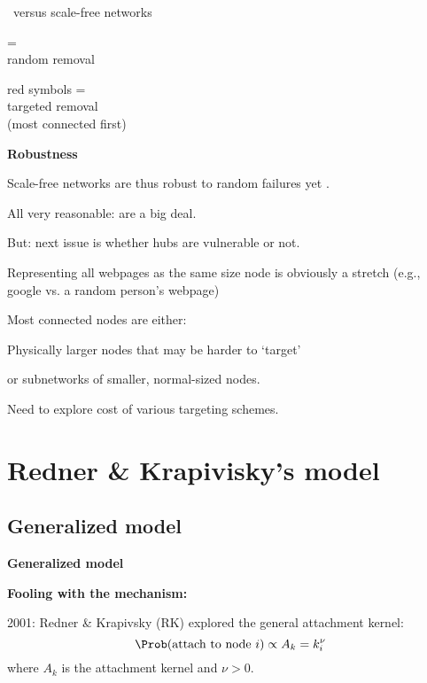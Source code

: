 \begin{frame}[label=]
\begin{frame}[label=]
\begin{frame}[label=]
\begin{frame}[label=]
\begin{frame}[label=]
\begin{frame}[label=]
\begin{frame}[label=]
\begin{frame}[label=]
\begin{frame}[label=]
\begin{frame}[label=]
\begin{frame}[label=]
\begin{frame}[label=]
\begin{frame}[label=]
\begin{frame}[label=]
\begin{frame}[label=]
\begin{frame}[label=]
\begin{frame}[label=]
\begin{frame}[label=]
\begin{frame}[label=]
\begin{frame}[label=]
     \erdosrenyi\ versus scale-free networks
   
    = \\
   {random} removal
   
   \alert{red symbols} = \\
   {targeted} removal \\
   (most connected first)
   

 


\begin{frame}[label=]
  \textbf{Robustness}  
  
  
  
    Scale-free networks are thus \alert{robust to random failures}
    yet .
   
    All very reasonable:  are a big deal.
   
    \alert{But}: next issue is whether hubs are vulnerable or not.
   
    Representing all webpages as the same size node is obviously
    a stretch (e.g., google vs. a random person's webpage)
   
    Most connected nodes are either:
    
    
      Physically larger nodes that may be harder to `target'
    
      or subnetworks of smaller, normal-sized nodes.
    
   
    Need to explore cost of various targeting schemes.
  
  


\section{Redner \& Krapivisky's model}

\subsection{Generalized model}


\begin{frame}[label=]
  \textbf{Generalized model}  

  \textbf{Fooling with the mechanism:}
    
    
      2001: Redner \& Krapivsky (RK)\cite{krapivsky2001a}
      explored the \alert{general attachment kernel}:
      {
      $$
      \Prob(\mbox{attach to node $i$}) \propto A_k  = k_{i}^\nu
      $$
      where $A_k$ is the attachment kernel and $\nu>0$.
      }
    

\end{frame}
\end{frame}
\end{frame}
\end{frame}
\end{frame}
\end{frame}
\end{frame}
\end{frame}
\end{frame}
\end{frame}
\end{frame}
\end{frame}
\end{frame}
\end{frame}
\end{frame}
\end{frame}
\end{frame}
\end{frame}
\end{frame}
\end{frame}
\end{frame}
\end{frame}
